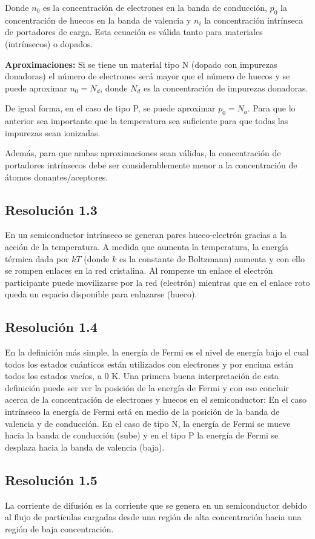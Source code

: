 \documentclass[
  11pt,
  letterpaper,
   addpoints,
   answers
  ]{exam}
\begin{document}
\begin{questions}
\begin{solution}
Donde $n_0$ es la concentración de electrones en la banda de conducción, $p_0$ la concentración de huecos en la banda de valencia y $n_i$ la concentración intrínseca de portadores de carga. Esta ecuación es válida tanto para materiales (intrínsecos) o dopados.

\textbf{Aproximaciones:} Si se tiene un material tipo N (dopado con impurezas donadoras) el número de electrones será mayor que el número de huecos y se puede aproximar $n_0 = N_d$, donde $N_d$ es la concentración de impurezas donadoras.

De igual forma, en el caso de tipo P, se puede aproximar $p_0 = N_a$. Para que lo anterior sea importante que la temperatura sea suficiente para que todas las impurezas sean ionizadas.

Además, para que ambas aproximaciones sean válidas, la concentración de portadores intrínsecos debe ser considerablemente menor a la concentración de átomos donantes/aceptores.

\subsection*{Resolución 1.3}
En un semiconductor intrínseco se generan pares hueco-electrón gracias a la acción de la temperatura. A medida que aumenta la temperatura, la energía térmica dada por $kT$ (donde $k$ es la constante de Boltzmann) aumenta y con ello se rompen enlaces en la red cristalina. Al romperse un enlace el electrón participante puede movilizarse por la red (electrón) mientras que en el enlace roto queda un espacio disponible para enlazarse (hueco).

\subsection*{Resolución 1.4}
En la definición más simple, la energía de Fermi es el nivel de energía bajo el cual todos los estados cuánticos están utilizados con electrones y por encima están todos los estados vacíos, a $0$ K. Una primera buena interpretación de esta definición puede ser ver la posición de la energía de Fermi y con eso concluir acerca de la concentración de electrones y huecos en el semiconductor: En el caso intrínseco la energía de Fermi está en medio de la posición de la banda de valencia y de conducción. En el caso de tipo N, la energía de Fermi se mueve hacia la banda de conducción (sube) y en el tipo P la energía de Fermi se desplaza hacia la banda de valencia (baja).

\subsection*{Resolución 1.5}
La corriente de difusión es la corriente que se genera en un semiconductor debido al flujo de partículas cargadas desde una región de alta concentración hacia una región de baja concentración. 


\end{solution}
\end{questions}
\end{document}
